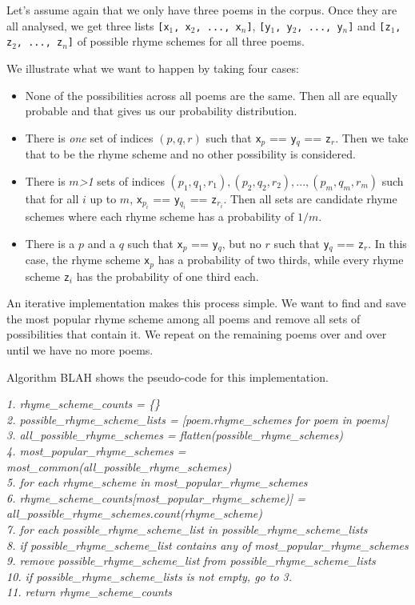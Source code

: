 Let's assume again that we only have three poems in the corpus. Once they are all analysed, we get three lists \texttt{[x$_1$, x$_2$, ..., x$_n$]}, \texttt{[y$_1$, y$_2$, ..., y$_n$]} and \texttt{[z$_1$, z$_2$, ..., z$_n$]} of possible rhyme schemes for all three poems.

We illustrate what we want to happen by taking four cases:
\begin{itemize}
\item{None of the possibilities across all poems are the same. Then all are equally probable and that gives us our probability distribution.}
\item{There is \textit{one} set of indices $(p, q, r)$ such that \texttt{x$_p$} == \texttt{y$_q$} == \texttt{z$_r$}. Then we take that to be the rhyme scheme and no other possibility is considered.}
\item{There is $m$\textit{\textgreater 1} sets of indices $(p_1, q_1, r_1), (p_2, q_2, r_2), ..., (p_m, q_m, r_m)$ such that for all $i$ up to $m$, \texttt{x$_{p_i}$} == \texttt{y$_{q_i}$} == \texttt{z$_{r_i}$}. Then all sets are candidate rhyme schemes where each rhyme scheme has a probability of $1/m$.}
\item{There is a $p$ and a $q$ such that \texttt{x$_p$} == \texttt{y$_q$}, but no $r$ such that \texttt{y$_q$} == \texttt{z$_r$}. In this case, the rhyme scheme \texttt{x$_p$} has a probability of two thirds, while every rhyme scheme \texttt{z$_i$} has the probability of one third each.}
\end{itemize}

An iterative implementation makes this process simple. We want to find and save the most popular rhyme scheme among all poems and remove all sets of possibilities that contain it. We repeat on the remaining poems over and over until we have no more poems. 

Algorithm BLAH shows the pseudo-code for this implementation.

\textit{
 1. rhyme\_scheme\_counts = \{\}\\
 2. possible\_rhyme\_scheme\_lists = [poem.rhyme\_schemes for poem in poems]\\
 3. all\_possible\_rhyme\_schemes = flatten(possible\_rhyme\_schemes)\\
 4. most\_popular\_rhyme\_schemes = most\_common(all\_possible\_rhyme\_schemes)\\
 5. for each rhyme\_scheme in most\_popular\_rhyme\_schemes\\
 6. 		rhyme\_scheme\_counts[most\_popular\_rhyme\_scheme)] = all\_possible\_rhyme\_schemes.count(rhyme\_scheme)\\
 7. for each possible\_rhyme\_scheme\_list in possible\_rhyme\_scheme\_lists\\
 8.		if possible\_rhyme\_scheme\_list contains any of  most\_popular\_rhyme\_schemes\\
 9.			remove possible\_rhyme\_scheme\_list from possible\_rhyme\_scheme\_lists\\
10. if possible\_rhyme\_scheme\_lists is not empty, go to 3.\\
11. return rhyme\_scheme\_counts\\
}

